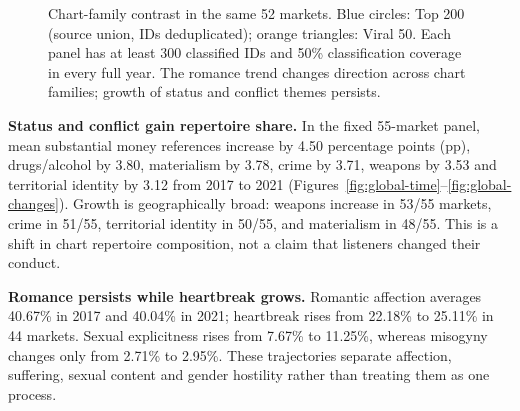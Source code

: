 \documentclass[10pt,a4paper,twocolumn]{article}
\begin{document}
\begin{figure}[t]
\centering{}
\caption{Chart-family contrast in the same 52 markets. Blue circles: Top 200 (source union, IDs deduplicated); orange triangles: Viral 50. Each panel has at least 300 classified IDs and 50\% classification coverage in every full year. The romance trend changes direction across chart families; growth of status and conflict themes persists.}
\label{fig:family-trends}
\end{figure}

\textbf{Status and conflict gain repertoire share.} In the fixed 55-market panel, mean substantial money references increase by 4.50 percentage points (pp), drugs/alcohol by 3.80, materialism by 3.78, crime by 3.71, weapons by 3.53 and territorial identity by 3.12 from 2017 to 2021 (Figures~\ref{fig:global-time}--\ref{fig:global-changes}). Growth is geographically broad: weapons increase in 53/55 markets, crime in 51/55, territorial identity in 50/55, and materialism in 48/55. This is a shift in chart repertoire composition, not a claim that listeners changed their conduct.

\textbf{Romance persists while heartbreak grows.} Romantic affection averages 40.67\% in 2017 and 40.04\% in 2021; heartbreak rises from 22.18\% to 25.11\% in 44 markets. Sexual explicitness rises from 7.67\% to 11.25\%, whereas misogyny changes only from 2.71\% to 2.95\%. These trajectories separate affection, suffering, sexual content and gender hostility rather than treating them as one process.
\end{document}
